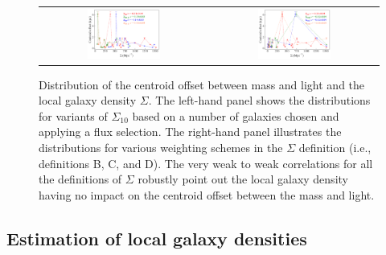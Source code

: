 \documentclass{aa}
\begin{document}
\begin{figure}[htbp]
    \centering
    \begin{tabular}{cc}
        \includegraphics[width=0.45\textwidth]{figures/centroid_offset_vs_Sigma_all.pdf} &
        \includegraphics[width=0.45\textwidth]{figures/centroid_offset_vs_Sigma_10AtoD.pdf} \\
    \end{tabular}
    \caption{Distribution of the centroid offset between mass and light and the local galaxy density $\Sigma$. The left-hand panel shows the distributions for variants of $\Sigma_{10}$ based on a number of galaxies chosen and applying a flux selection. The right-hand panel illustrates the distributions for various weighting schemes in the $\Sigma$ definition (i.e., definitions B, C, and D). The very weak to weak correlations for all the definitions of $\Sigma$ robustly point out the local galaxy density having no impact on the centroid offset between the mass and light.}
    \label{fig:cent_off_Sigma}
\end{figure}



\subsection{Estimation of local galaxy densities} \label{sec:local_densities}

\end{document}
